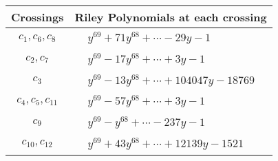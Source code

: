\documentclass[1p]{elsarticle_modified}
\theoremstyle{definition}
\begin{document}
\begin{tabular}{m{50pt}|m{274pt}}
Crossings & \hspace{64pt}Riley Polynomials at each crossing \\
\hline $$\begin{aligned}c_{1},c_{6},c_{8}\end{aligned}$$&$\begin{aligned}
&y^{69}+71 y^{68}+\cdots-29 y-1
\end{aligned}$\\
\hline $$\begin{aligned}c_{2},c_{7}\end{aligned}$$&$\begin{aligned}
&y^{69}-17 y^{68}+\cdots+3 y-1
\end{aligned}$\\
\hline $$\begin{aligned}c_{3}\end{aligned}$$&$\begin{aligned}
&y^{69}-13 y^{68}+\cdots+104047 y-18769
\end{aligned}$\\
\hline $$\begin{aligned}c_{4},c_{5},c_{11}\end{aligned}$$&$\begin{aligned}
&y^{69}-57 y^{68}+\cdots+3 y-1
\end{aligned}$\\
\hline $$\begin{aligned}c_{9}\end{aligned}$$&$\begin{aligned}
&y^{69}- y^{68}+\cdots-237 y-1
\end{aligned}$\\
\hline $$\begin{aligned}c_{10},c_{12}\end{aligned}$$&$\begin{aligned}
&y^{69}+43 y^{68}+\cdots+12139 y-1521
\end{aligned}$\\
\hline
\end{tabular}
\vskip 2pc
\end{document}
